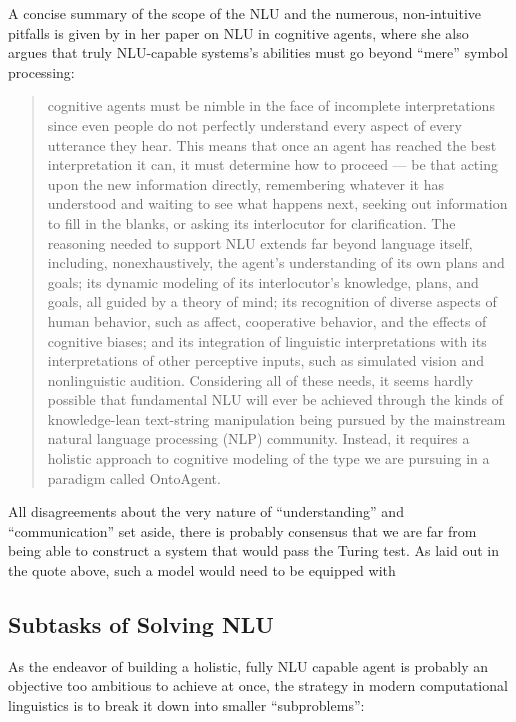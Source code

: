 {\color{red} A concise summary of the scope of the NLU and the numerous, non-intuitive pitfalls is given by
\cite{mcshane2017natural} in her paper on NLU in cognitive agents, where she also argues that
truly NLU-capable systems's abilities must go beyond ``mere'' symbol processing:

\begin{quote}
  cognitive agents must be nimble in the face of incomplete interpretations since even people do not
  perfectly understand every aspect of every utterance they hear. This means that once an agent
  has reached the best interpretation it can, it must determine how to proceed — be that acting
  upon the new information directly, remembering whatever it has understood and waiting to see
  what happens next, seeking out information to fill in the blanks, or asking its interlocutor
  for clarification. The reasoning needed to support NLU extends far beyond language itself,
  including, nonexhaustively, the agent’s understanding of its own plans and goals; its dynamic
  modeling of its interlocutor’s knowledge, plans, and goals, all guided by a theory of mind;
  its recognition of diverse aspects of human behavior, such as affect, cooperative behavior,
  and the effects of cognitive biases; and its integration of linguistic interpretations with
  its interpretations of other perceptive inputs, such as simulated vision and nonlinguistic
  audition. Considering all of these needs, it seems hardly possible that fundamental NLU
  will ever be achieved through the kinds of knowledge-lean text-string manipulation being
  pursued by the mainstream natural language processing (NLP) community. Instead, it requires
  a holistic approach to cognitive modeling of the type we are pursuing in a paradigm called
  OntoAgent.
\end{quote}}

All disagreements about the very nature of ``understanding'' and ``communication'' set aside,
there is probably consensus that we are far from being able to construct a system that
would pass the Turing test.
As laid out in the quote above, such a model would need
to be equipped with



\subsection{Subtasks of Solving NLU}

As the endeavor of building a holistic, fully NLU capable agent is probably an objective too
ambitious to achieve at once, the strategy in modern computational linguistics is to break it
down into smaller ``subproblems'':

